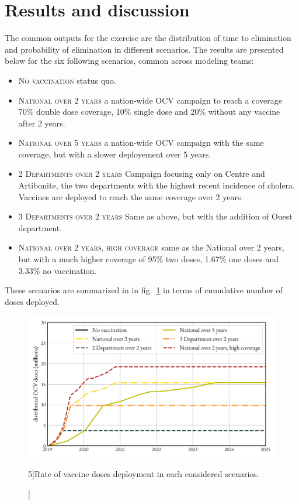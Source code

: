 \section{Results and discussion}
The common outputs for the exercise are the distribution of time to elimination and probability of elimination in different scenarios. The results are presented below for the six following scenarios, common across modeling teams:
\begin{itemize}
	\item \textsc{No vaccination} status quo.
	\item \textsc{National over 2 years} a nation-wide OCV campaign to reach a coverage 70\% double dose coverage, 10\% single dose and 20\% without any vaccine after 2 years.
	\item 	 \textsc{National over 5 years} a nation-wide OCV campaign with the same coverage, but with a slower deployement over 5 years.
	\item \textsc{2 Departments over 2 years} Campaign focusing only on Centre and Artibonite, the two departments with the highest recent incidence of cholera. Vaccines are deployed to reach the same coverage over 2 years.
	\item \textsc{3 Departments over 2 years} Same as above, but with the addition of Ouest department.
	\item \textsc{National over 2 years, high coverage} same as the National over 2 years, but with a much higher coverage of 95\% two doses, 1.67\% one doses and 3.33\% no vaccination.
\end{itemize}
These scenarios are summarized in in fig.~\ref{fig:deploy} in terms of cumulative number of doses deployed.

\begin{figure}
\begin{center}
\includegraphics{fig_cholera-haiti-ocv/haiti-deploy.pdf}
\caption[Rate of vaccine doses deployment in each considered scenarios][5\baselineskip]{Rate of vaccine doses deployment in each considered scenarios.}\label{fig:deploy}
\end{center}
\end{figure}

